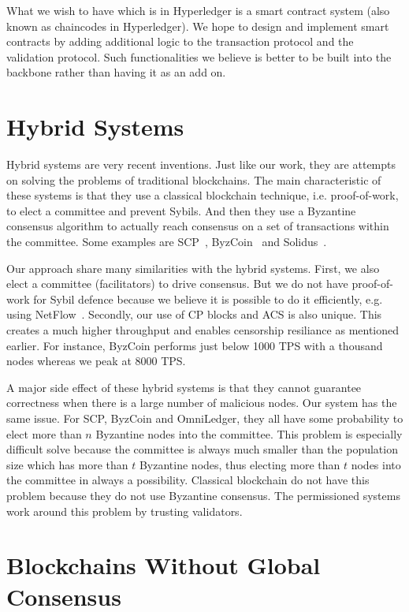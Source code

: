 What we wish to have which is in Hyperledger is a smart contract system (also known as chaincodes in Hyperledger).
We hope to design and implement smart contracts by adding additional logic to the transaction protocol and the validation protocol.
Such functionalities we believe is better to be built into the backbone rather than having it as an add on.


\section{Hybrid Systems}
Hybrid systems are very recent inventions.
Just like our work, they are attempts on solving the problems of traditional blockchains.
The main characteristic of these systems is that they use a classical blockchain technique,
i.e. proof-of-work, to elect a committee and prevent Sybils.
And then they use a Byzantine consensus algorithm to actually reach consensus on a set of transactions within the committee.
Some examples are SCP~\cite{luu2015scp}, ByzCoin~\cite{kogias2016enhancing} and Solidus~\cite{abraham2016solidus}.

Our approach share many similarities with the hybrid systems.
First, we also elect a committee (facilitators) to drive consensus.
But we do not have proof-of-work for Sybil defence because we believe 
it is possible to do it efficiently, e.g. using NetFlow~\cite{pimotte}.
Secondly, our use of CP blocks and ACS is also unique.
This creates a much higher throughput and enables censorship resiliance as mentioned earlier.
For instance, ByzCoin performs just below 1000 TPS with a thousand nodes whereas we peak at 8000 TPS.

A major side effect of these hybrid systems is that they cannot guarantee correctness when there is a large number of malicious nodes.
Our system has the same issue.
For SCP, ByzCoin and OmniLedger, they all have some probability to elect more than $n$ Byzantine nodes into the committee.
This problem is especially difficult solve because the committee is always much smaller than the population size which has more than $t$ Byzantine nodes,
thus electing more than $t$ nodes into the committee in always a possibility.
Classical blockchain do not have this problem because they do not use Byzantine consensus.
The permissioned systems work around this problem by trusting validators.

\section{Blockchains Without Global Consensus}

